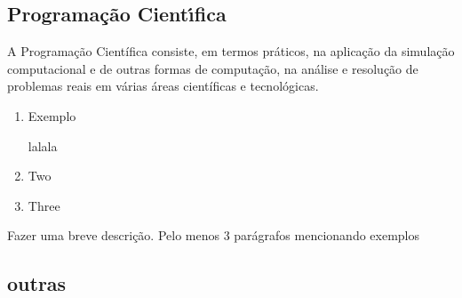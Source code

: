 \subsection{ Programa\c{c}\~{a}o Cient\'{\i}fica}
A Programação Científica
consiste, em termos práticos, na aplicação da 
simulação computacional e de outras formas de
computação, na análise e resolução de problemas 
reais em várias áreas científicas e tecnológicas.


\begin{enumerate}
   \item Exemplo 
   
   lalala
   \item Two
   \item Three
\end{enumerate}


Fazer uma breve descri\c{c}\~{a}o. Pelo menos 3 par\'{a}grafos mencionando exemplos

\subsection{ outras}